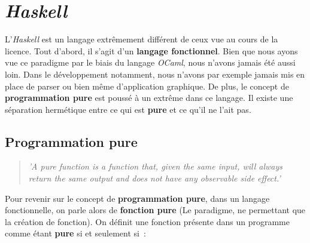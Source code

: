 \section{\textit{Haskell}}

L'\textit{Haskell} est un langage extrêmement différent de ceux vue au cours de 
la licence. Tout d'abord, il s'agit d'un \textbf{langage fonctionnel}. Bien que 
nous ayons vue ce paradigme par le biais du langage \textit{OCaml}, 
nous n’avons jamais été aussi loin. Dans le développement notamment, nous 
n'avons par exemple jamais mis en place de parser ou bien même d'application 
graphique. De plus, le concept de \textbf{programmation pure} est poussé à un 
extrême dans ce langage. Il existe une séparation hermétique entre ce qui est 
\textbf{pure} et ce qu'il ne l'ait pas.

\subsection{Programmation pure}

\begin{quotation}
    \textit{'A pure function is a function that, given the same input, will 
    always return the same output and does not have any observable side effect.'
    }\cite{citationPureProg}
\end{quotation}

Pour revenir sur le concept de \textbf{programmation pure}, dans un langage 
fonctionnelle, on parle alors de \textbf{fonction pure} (Le paradigme, ne 
permettant que la création de fonction). On définit une fonction présente dans 
un programme comme étant \textbf{pure} si et seulement si~:

